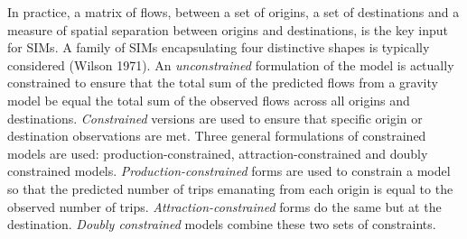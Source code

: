 \documentclass[11pt,letterpaper]{article}
\begin{document}
In practice, a matrix of flows, between a set of origins, a set of destinations and a measure of spatial separation between origins and destinations, is the key input for SIMs.
A family of SIMs encapsulating four distinctive shapes is typically considered (Wilson 1971).
An \emph{unconstrained} formulation of the model is actually constrained to ensure that the total sum of the predicted flows from a gravity model be equal the total sum of the observed flows across all origins and destinations.
\emph{Constrained} versions are used to ensure that specific origin or destination observations are met.
Three general formulations of constrained models are used: production-constrained, attraction-constrained and doubly constrained models.
\emph{Production-constrained} forms are used to constrain a model so that the predicted number of trips emanating from each origin is equal to the observed number of trips.
\emph{Attraction-constrained} forms do the same but at the destination.
\emph{Doubly constrained} models combine these two sets of constraints.
\end{document}
